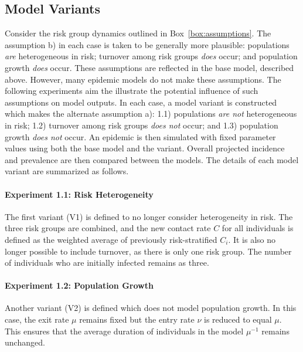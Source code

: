 \subsection{Model Variants}\label{ss:exp-variants}
Consider the risk group dynamics outlined in Box~\ref{box:assumptions}.
The assumption b) in each case is taken to be generally more plausible:
populations \textit{are} heterogeneous in risk;
turnover among risk groups \textit{does} occur; and
population growth \textit{does} occur.
These assumptions are reflected in the base model, described above.
However, many epidemic models do not make these assumptions.
The following experiments aim the illustrate the potential influence
of such assumptions on model outputs.
In each case, a model variant is constructed
which makes the alternate assumption a):
1.1) populations \textit{are not} heterogeneous in risk;
1.2) turnover among risk groups \textit{does not} occur; and
1.3) population growth \textit{does not} occur.
An epidemic is then simulated with fixed parameter values
using both the base model and the variant.
Overall projected incidence and prevalence are then compared between the models.
The details of each model variant are summarized as follows.
\paragraph{Experiment 1.1: Risk Heterogeneity}\label{p:exp-1-hetero}
The first variant (V1) is defined
to no longer consider heterogeneity in risk.
The three risk groups are combined,
and the new contact rate $C$ for all individuals is defined as
the weighted average of previously risk-stratified $C_i$.
It is also no longer possible to include turnover,
as there is only one risk group.
The number of individuals who are initially infected remains as three.
\paragraph{Experiment 1.2: Population Growth}\label{p:exp-1-growth}
Another variant (V2) is defined which does not model population growth.
In this case, the exit rate $\mu$ remains fixed
but the entry rate $\nu$ is reduced to equal $\mu$.
This ensures that the average duration of individuals in the model $\mu^{-1}$ remains unchanged.
